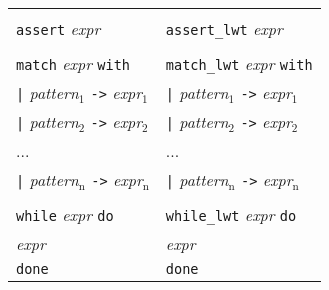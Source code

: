 \begin{tabular}{p{}p{}}
                                                                                  &                                                                                      \\
 {\tt assert} \emph{expr}                                                            & {\tt assert\_lwt} \emph{expr}                                                            \\
                                                                                  &                                                                                      \\
 {\tt match} \emph{expr} {\tt with}                                                  & {\tt match\_lwt} \emph{expr} {\tt with}                                                  \\
 \emph{ } {\tt |} \emph{pattern$_{\mbox{1}}$} {\tt ->} \emph{expr$_{\mbox{1}}$}                            & \emph{ } {\tt |} \emph{pattern$_{\mbox{1}}$} {\tt ->} \emph{expr$_{\mbox{1}}$}                                \\
 \emph{ } {\tt |} \emph{pattern$_{\mbox{2}}$} {\tt ->} \emph{expr$_{\mbox{2}}$}                            & \emph{ } {\tt |} \emph{pattern$_{\mbox{2}}$} {\tt ->} \emph{expr$_{\mbox{2}}$}                                \\
 \emph{ } ...                                                                        & \emph{ } ...                                                                            \\
 \emph{ } {\tt |} \emph{pattern$_{\mbox{n}}$} {\tt ->} \emph{expr$_{\mbox{n}}$}                            & \emph{ } {\tt |} \emph{pattern$_{\mbox{n}}$} {\tt ->} \emph{expr$_{\mbox{n}}$}                                \\
                                                                                  &                                                                                      \\
 {\tt while} \emph{expr} {\tt do}                                                    & {\tt while\_lwt} \emph{expr} {\tt do}                                                    \\
 \emph{ expr}                                                                        & \emph{ expr}                                                                            \\
 {\tt done}                                                                       & {\tt done}                                                                           \\
\end{tabular}

